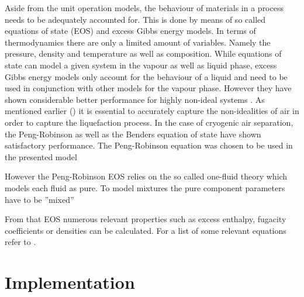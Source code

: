         Aside from the unit operation models, the behaviour of materials in a process needs to be adequately
        accounted for. This is done by means of so called equations of state (EOS) and excess Gibbs energy
        models. In terms of thermodynamics there are only a limited amount of variables. Namely the pressure,
        density and temperature as well as composition. While equations of state can model a given system in
        the vapour as well as liquid phase, excess Gibbs energy models only account for the behaviour of a liquid
        and need to be used in conjunction with other models for the vapour phase. However they have shown
        considerable better performance for highly non-ideal systems \cite{AndreasPfennig.2003}. As mentioned
        earlier () it is essential to accurately capture the non-idealities of air
        in order to capture the liquefaction process. In the case of cryogenic air separation, the Peng-Robinson
        as well as the Benders equation of state have shown satisfactory performance. The Peng-Robinson equation
        was chosen to be used in the presented model

        However the Peng-Robinson EOS relies on the so called one-fluid theory which models each fluid as pure.
        To model mixtures the pure component parameters have to be ''mixed''

        From that EOS numerous relevant properties such as excess enthalpy, fugacity coefficients or densities
        can be calculated. For a list of some relevant equations refer to .

    \section{Implementation}
    \label{sec:mathpro:implementation}
        
